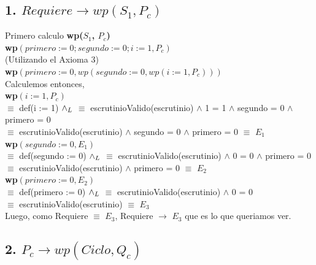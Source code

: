 \documentclass[10pt,a4paper]{article}
\begin{document}
\newpage

\subsection{1. $Requiere \rightarrow wp(S_1, P_c)$} \vspace{0.1cm}

\noindent Primero calculo \textbf{wp($S_1$, $P_c$)} \\

\noindent \textbf{wp$(primero := 0 ;segundo := 0 ;i:= 1, P_c)$} \\

\noindent (Utilizando el Axioma 3)\\

\noindent \textbf{wp$(primero := 0, wp(segundo := 0, wp(i:=1, P_c)))$}\\

\noindent Calculemos entonces, \\

\noindent \textbf{wp$(i:=1, P_c)$} \vspace{0.1cm} \\
\noindent $\equiv$ def(i := 1) $\land _L$ $\equiv$ escrutinioValido(escrutinio) $\land$ 1 = 1 $\land$ segundo = 0 $\land$ primero = 0 \\
\noindent $\equiv$ escrutinioValido(escrutinio) $\land$ segundo = 0 $\land$ primero = 0 $\equiv$ $E_1$ \\

\noindent \textbf{wp$(segundo :=0, E_1)$} \vspace{0.1cm} \\
\noindent $\equiv$ def(segundo := 0) $\land _L$ $\equiv$ escrutinioValido(escrutinio) $\land$ 0 = 0 $\land$ primero = 0 \\
\noindent $\equiv$ escrutinioValido(escrutinio) $\land$ primero = 0 $\equiv$ $E_2$ \\

\noindent \textbf{wp$(primero :=0, E_2)$} \vspace{0.1cm} \\
\noindent $\equiv$ def(primero := 0) $\land _L$ $\equiv$ escrutinioValido(escrutinio) $\land$ 0 = 0\\
\noindent $\equiv$ escrutinioValido(escrutinio) $\equiv$ $E_3$ \\

\noindent Luego, como Requiere $\equiv$ $E_3$, Requiere $\rightarrow$ $E_3$ que es lo que queriamos ver.

\subsection{2. $P_c \rightarrow wp(Ciclo, Q_c)$ }
\end{document}
